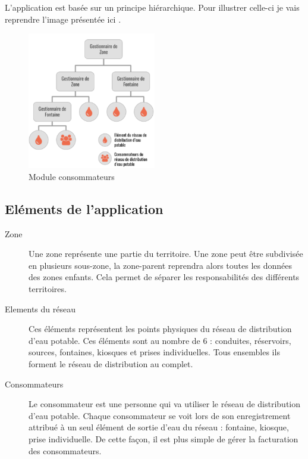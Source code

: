\documentclass{EPL-master-thesis-covers-FR}
\begin{document}
				L'application est basée sur un principe hiérarchique. Pour illustrer celle-ci je vais reprendre l'image présentée ici \cite{ref:haitiwater}. 
				
				\begin{figure}[H]
					\centering
					\includegraphics[width=0.5\textwidth]{images/hierarchie}
					\caption{Module consommateurs}
				\end{figure}
				
				
			\subsection{Eléments de l'application}
				\begin{description}
					\item[Zone] Une zone représente une partie du territoire. Une zone peut être subdivisée en plusieurs sous-zone, la zone-parent reprendra alors toutes les données des zones enfants. Cela permet de séparer les responsabilités des différents territoires.
					\item[Elements du réseau] Ces éléments représentent les points physiques du réseau de distribution d'eau potable. Ces éléments sont au nombre de 6 : conduites, réservoirs, sources, fontaines, kiosques et prises individuelles. Tous ensembles ils forment le réseau de distribution au complet. 
					\item[Consommateurs] Le consommateur est une personne qui va utiliser le réseau de distribution d'eau potable. Chaque consommateur se voit lors de son enregistrement attribué à un seul élément de sortie d'eau du réseau : fontaine, kiosque, prise individuelle. De cette façon, il est plus simple de gérer la facturation des consommateurs.
				\end{description}
				
			
				
				
\end{document}

